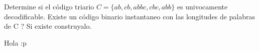 
Determine si el código triario $C = \{ab, cb, abbc, cbc, abb\}$ es univocamente decodificable. Existe un código binario instantaneo con las longitudes de palabras de C ? Si existe construyalo.

\begin{sol}
    Hola :p
\end{sol}